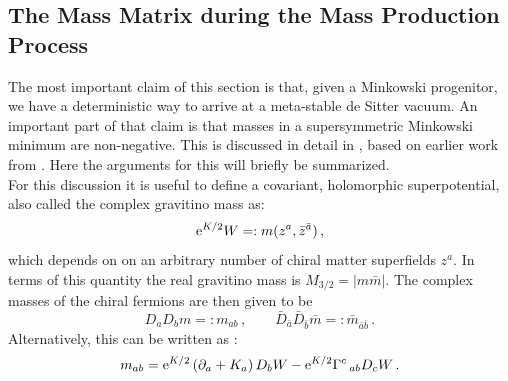 \documentclass[12pt]{report}
\newcommand{\be}{\begin{equation}}
\newcommand{\ee}{\end{equation}}
\def\rme{{\rm e}}
\begin{document}
\subsection{The Mass Matrix during the Mass Production Process}
\label{sec:massmass}
The most important claim of this section is that, given a Minkowski progenitor, we have a deterministic way to arrive at a meta-stable de Sitter vacuum. An important part of that claim is that masses in a supersymmetric Minkowski minimum are non-negative. This is discussed in detail in \cite{Kallosh:2019zgd}, based on earlier work from \cite{BlancoPillado:2005fn}. Here the arguments for this will briefly be summarized.\\
For this discussion it is useful to define a covariant, holomorphic superpotential, also called the complex gravitino mass as:
\be 
\rme^{K/2} W =: m(z^a,\bar{z}^{\bar{a}})\,,
\ee
which depends on on an arbitrary number of chiral matter superfields $z^a$. In terms of this quantity the real gravitino mass is $M_{3/2} = |m\bar{m}|$. The complex masses of the chiral fermions are then given to be
\be 
D_a D_b m =: m_{ab}\,,\qquad \bar{D}_{\bar{a}}\bar{D}_{\bar{b}}\bar{m} =: \bar{m}_{\bar{a}\bar{b}}\,.
\ee
Alternatively, this can be written as \cite{Freedman:2012zz}:
\be 
m_{ab} = \rme^{K/2} \left(\partial_a + K_a\right) D_b W - \rme^{K/2} \Gamma^{c}\,_{ab} D_c W\,.
\ee
\end{document}
